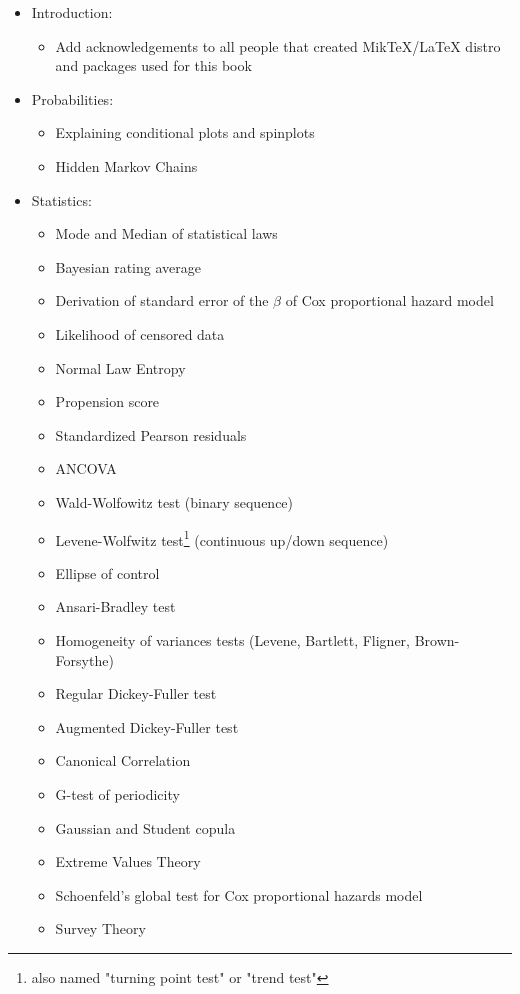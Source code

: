 	\begin{itemize}
		\item Introduction:
			\begin{itemize}
				\item Add acknowledgements to all people that created MikTeX/LaTeX distro and packages used for this book
			\end{itemize}
		\item Probabilities:
			\begin{itemize}
				\item Explaining conditional plots and spinplots
				\item Hidden Markov Chains
			\end{itemize}
		\item Statistics: 
			\begin{itemize}
				\item Mode and Median of statistical laws	
				\item Bayesian rating average
				\item Derivation of standard error of the $\beta$ of Cox proportional hazard model		
				\item Likelihood of censored data
				\item Normal Law Entropy
				\item Propension score
				\item Standardized Pearson residuals
				\item ANCOVA
				\item Wald-Wolfowitz test (binary sequence)
				\item Levene-Wolfwitz test\footnote{also named "turning point test" or "trend test"} (continuous up/down sequence)
				\item Ellipse of control
				\item Ansari-Bradley test
				\item Homogeneity of variances tests (Levene, Bartlett, Fligner,  Brown-Forsythe)
				\item Regular Dickey-Fuller test
				\item Augmented Dickey-Fuller test
				\item Canonical Correlation
				\item G-test of periodicity
				\item Gaussian and Student copula
				\item Extreme Values Theory
				\item Schoenfeld’s global test for Cox proportional hazards model
				\item Survey Theory

\end{itemize}
\end{itemize}
